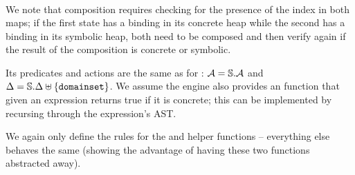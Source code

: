 \begin{align*}
\end{align*}

We note that composition requires checking for the presence of the index in both maps; if the first state has a binding in its concrete heap while the second has a binding in its symbolic heap, both need to be composed and then verify again if the result of the composition is concrete or symbolic.

Its predicates and actions are the same as for \PMap{}: ${\cal{A}} = \mathbb S.{\cal{A}}$ and ${\Delta = \mathbb S.\Delta \uplus \{\texttt{domainset}\}}$. We assume the engine also provides an  function that given an expression returns true if it is concrete; this can be implemented by recursing through the expression's AST.

We again only define the rules for the  and  helper functions -- everything else behaves the same (showing the advantage of having these two functions abstracted away).

